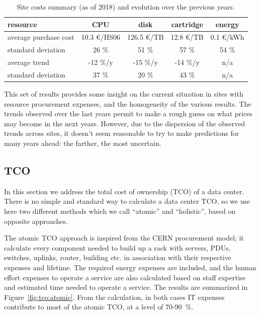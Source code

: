 \begin{table}[h]
    \centering
    \caption{Site costs summary (as of 2018) and evolution over the previous years.}
    \label{tab:sitecosts}
    \begin{tabular}{l|cccc}
        \hline
        resource & CPU & disk & cartridge & energy \\\hline
        average purchase cost & 10.3 \euro/HS06 & 126.5 \euro/TB & 12.8 \euro/TB & 0.1 \euro/kWh\\\hline
        standard deviation & 26 \% & 51 \% & 57 \% & 54 \% \\\hline
        average trend & -12 \%/y & -15 \%/y & -14 \%/y & n/a \\\hline
        standard deviation & 37 \% & 20 \% & 43 \% & n/a \\\hline
    \end{tabular}
\end{table}


This set of results provides some insight on the current situation in sites with resource procurement expenses, and
the homogeneity of the various results. The trends observed over the last years permit to make a rough guess on what prices may become
in the next years. However, due to the dispersion of the observed trends across sites, it doesn't seem reasonable to
try to make predictions for many years ahead: the farther, the most uncertain.

\subsection{\label{sec:sitecost:tco}TCO}

In this section we address the total cost of ownership (TCO) of a data center.
There is no simple and standard way to calculate a data center TCO, so we use here two different methods which we call
``atomic'' and ``holistic'', based on opposite approaches.

The atomic TCO approach is inspired from the CERN procurement model; it calculate every component needed to build up
a rack with servers, PDUs, switches, uplinks, router, building etc. in association with their respective expenses and lifetime.
The required energy expenses are included, and the human effort expenses to operate a service are also calculated
based on staff expertise and estimated time needed to operate a service.
The results are summarized in Figure~\ref{fig:tco:atomic}.
From the calculation, in both cases IT expenses contribute to most of the atomic TCO, at a level of 70-90~\%.


